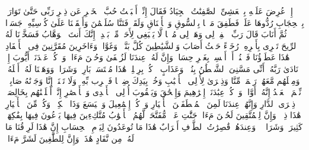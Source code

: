 \startbuffer[\q:38:31]
إِذۡ عُرِضَ عَلَیۡهِ بِٱلۡعَشِیِّ ٱلصَّٰفِنَٰتُ ٱلۡجِیَادُ%
\stopbuffer%
\startbuffer[\q:38:32]
فَقَالَ إِنِّیۤ أَحۡبَبۡتُ حُبَّ ٱلۡخَیۡرِ عَن ذِكۡرِ رَبِّی حَتَّىٰ تَوَارَتۡ بِٱلۡحِجَابِ%
\stopbuffer%
\startbuffer[\q:38:33]
رُدُّوهَا عَلَیَّۖ فَطَفِقَ مَسۡحَۢا بِٱلسُّوقِ وَٱلۡأَعۡنَاقِ%
\stopbuffer%
\startbuffer[\q:38:34]
وَلَقَدۡ فَتَنَّا سُلَیۡمَٰنَ وَأَلۡقَیۡنَا عَلَىٰ كُرۡسِیِّهِۦ جَسَدࣰا ثُمَّ أَنَابَ%
\stopbuffer%
\startbuffer[\q:38:35]
قَالَ رَبِّ ٱغۡفِرۡ لِی وَهَبۡ لِی مُلۡكࣰا لَّا یَنۢبَغِی لِأَحَدࣲ مِّنۢ بَعۡدِیۤۖ إِنَّكَ أَنتَ ٱلۡوَهَّابُ%
\stopbuffer%
\startbuffer[\q:38:36]
فَسَخَّرۡنَا لَهُ ٱلرِّیحَ تَجۡرِی بِأَمۡرِهِۦ رُخَاۤءً حَیۡثُ أَصَابَ%
\stopbuffer%
\startbuffer[\q:38:37]
وَٱلشَّیَٰطِینَ كُلَّ بَنَّاۤءࣲ وَغَوَّاصࣲ%
\stopbuffer%
\startbuffer[\q:38:38]
وَءَاخَرِینَ مُقَرَّنِینَ فِی ٱلۡأَصۡفَادِ%
\stopbuffer%
\startbuffer[\q:38:39]
هَٰذَا عَطَاۤؤُنَا فَٱمۡنُنۡ أَوۡ أَمۡسِكۡ بِغَیۡرِ حِسَابࣲ%
\stopbuffer%
\startbuffer[\q:38:40]
وَإِنَّ لَهُۥ عِندَنَا لَزُلۡفَىٰ وَحُسۡنَ مَءَابࣲ%
\stopbuffer%
\startbuffer[\q:38:41]
وَٱذۡكُرۡ عَبۡدَنَاۤ أَیُّوبَ إِذۡ نَادَىٰ رَبَّهُۥۤ أَنِّی مَسَّنِیَ ٱلشَّیۡطَٰنُ بِنُصۡبࣲ وَعَذَابٍ%
\stopbuffer%
\startbuffer[\q:38:42]
ٱرۡكُضۡ بِرِجۡلِكَۖ هَٰذَا مُغۡتَسَلُۢ بَارِدࣱ وَشَرَابࣱ%
\stopbuffer%
\startbuffer[\q:38:43]
وَوَهَبۡنَا لَهُۥۤ أَهۡلَهُۥ وَمِثۡلَهُم مَّعَهُمۡ رَحۡمَةࣰ مِّنَّا وَذِكۡرَىٰ لِأُو۟لِی ٱلۡأَلۡبَٰبِ%
\stopbuffer%
\startbuffer[\q:38:44]
وَخُذۡ بِیَدِكَ ضِغۡثࣰا فَٱضۡرِب بِّهِۦ وَلَا تَحۡنَثۡۗ إِنَّا وَجَدۡنَٰهُ صَابِرࣰاۚ نِّعۡمَ ٱلۡعَبۡدُ إِنَّهُۥۤ أَوَّابࣱ%
\stopbuffer%
\startbuffer[\q:38:45]
وَٱذۡكُرۡ عِبَٰدَنَاۤ إِبۡرَٰهِیمَ وَإِسۡحَٰقَ وَیَعۡقُوبَ أُو۟لِی ٱلۡأَیۡدِی وَٱلۡأَبۡصَٰرِ%
\stopbuffer%
\startbuffer[\q:38:46]
إِنَّاۤ أَخۡلَصۡنَٰهُم بِخَالِصَةࣲ ذِكۡرَى ٱلدَّارِ%
\stopbuffer%
\startbuffer[\q:38:47]
وَإِنَّهُمۡ عِندَنَا لَمِنَ ٱلۡمُصۡطَفَیۡنَ ٱلۡأَخۡیَارِ%
\stopbuffer%
\startbuffer[\q:38:48]
وَٱذۡكُرۡ إِسۡمَٰعِیلَ وَٱلۡیَسَعَ وَذَا ٱلۡكِفۡلِۖ وَكُلࣱّ مِّنَ ٱلۡأَخۡیَارِ%
\stopbuffer%
\startbuffer[\q:38:49]
هَٰذَا ذِكۡرࣱۚ وَإِنَّ لِلۡمُتَّقِینَ لَحُسۡنَ مَءَابࣲ%
\stopbuffer%
\startbuffer[\q:38:50]
جَنَّٰتِ عَدۡنࣲ مُّفَتَّحَةࣰ لَّهُمُ ٱلۡأَبۡوَٰبُ%
\stopbuffer%
\startbuffer[\q:38:51]
مُتَّكِءِینَ فِیهَا یَدۡعُونَ فِیهَا بِفَٰكِهَةࣲ كَثِیرَةࣲ وَشَرَابࣲ%
\stopbuffer%
\startbuffer[\q:38:52]
۞ وَعِندَهُمۡ قَٰصِرَٰتُ ٱلطَّرۡفِ أَتۡرَابٌ%
\stopbuffer%
\startbuffer[\q:38:53]
هَٰذَا مَا تُوعَدُونَ لِیَوۡمِ ٱلۡحِسَابِ%
\stopbuffer%
\startbuffer[\q:38:54]
إِنَّ هَٰذَا لَرِزۡقُنَا مَا لَهُۥ مِن نَّفَادٍ%
\stopbuffer%
\startbuffer[\q:38:55]
هَٰذَاۚ وَإِنَّ لِلطَّٰغِینَ لَشَرَّ مَءَابࣲ%
